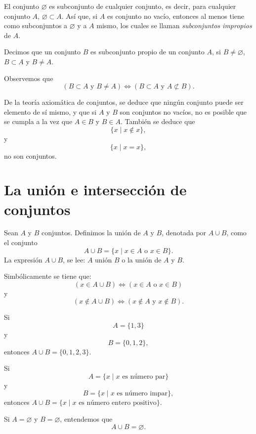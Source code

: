 El conjunto $\varnothing$ es subconjunto de cualquier conjunto, es decir, para cualquier conjunto $A$, $\varnothing \subset A$. Así que, si $A$ es conjunto no vacío, entonces al menos tiene como subconjuntos a $\varnothing$ y a $A$ mismo, los cuales se llaman \emph{subconjuntos impropios} de $A$.

\begin{definicion}{}{}
    Decimos que un conjunto $B$ es subconjunto propio de un conjunto $A$, si $B \neq \varnothing$, $B \subset A$ y $B \neq A$.
\end{definicion}

Observemos que
$$(B \subset A \text{ y } B \neq A) \Longleftrightarrow(B \subset A \text{ y } A \not \subset B).$$

De la teoría axiomática de conjuntos, se deduce que ningún conjunto puede ser elemento de sí mismo, y que si $A$ y $B$ son conjuntos no vacíos, no es posible que se cumpla a la vez que $A \in B$ y $B \in A$. También se deduce que
$$\{ x \mid x \notin x \},$$
y
$$\{x \mid x = x \},$$
no son conjuntos.

\section{La unión e intersección de conjuntos}

\begin{definicion}{}{}
    Sean $A$ y $B$ conjuntos. Definimos la unión de $A$ y $B$, denotada por $A \cup B$, como el conjunto
    $$A \cup B = \{x \mid x \in A \text{ o } x \in B\}.$$
    La expresión $A \cup B$, se lee: $A$ unión $B$ o la unión de $A$ y $B$.
\end{definicion}

Simbólicamente se tiene que:
$$(x \in A \cup B) \Longleftrightarrow(x \in A \text{ o } x \in B)$$
y
$$(x \notin A \cup B) \Longleftrightarrow(x \notin A \text{ y } x \notin B).$$
\begin{examplebox}{}{}
    Si
    $$A = \{1,  3\}$$
    y
    $$B = \{0,  1,  2\},$$
    entonces $A \cup B = \{0,  1,  2,  3\}$.
\end{examplebox}

\begin{examplebox}{}{}
    Si
    $$A = \{x \mid x \text { es número par}\}$$
    y
    $$B = \{x \mid x \text { es número impar}\},$$
    entonces $A \cup B = \{x \mid x \text{ es número entero positivo}\}$.
\end{examplebox}

\begin{examplebox}{}{}
    Si $A = \varnothing$ y $B = \varnothing$, entendemos que
    $$A \cup B = \varnothing.$$
\end{examplebox}

